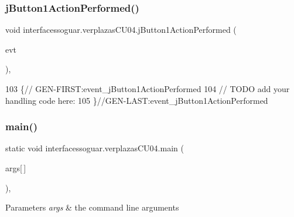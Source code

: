 \subsubsection{\texorpdfstring{j\+Button1\+Action\+Performed()}{jButton1ActionPerformed()}}
{\footnotesize\ttfamily void interfacessoguar.\+verplazas\+C\+U04.\+j\+Button1\+Action\+Performed (\begin{DoxyParamCaption}\item[{java.\+awt.\+event.\+Action\+Event}]{evt }\end{DoxyParamCaption})\hspace{0.3cm}{\ttfamily [inline]}, {\ttfamily [private]}}


\begin{DoxyCode}
103                                                                          \{\textcolor{comment}{//
      GEN-FIRST:event\_jButton1ActionPerformed}
104         \textcolor{comment}{// TODO add your handling code here:}
105     \}\textcolor{comment}{//GEN-LAST:event\_jButton1ActionPerformed}
\end{DoxyCode}
\mbox{\label{classinterfacessoguar_1_1verplazas_c_u04_af6da6c0d0f3975cf3a27627af8407ae8}} 
\subsubsection{\texorpdfstring{main()}{main()}}
{\footnotesize\ttfamily static void interfacessoguar.\+verplazas\+C\+U04.\+main (\begin{DoxyParamCaption}\item[{String}]{args\mbox{[}$\,$\mbox{]} }\end{DoxyParamCaption})\hspace{0.3cm}{\ttfamily [inline]}, {\ttfamily [static]}}


\begin{DoxyParams}{Parameters}
{\em args} & the command line arguments \\
\hline
\end{DoxyParams}

